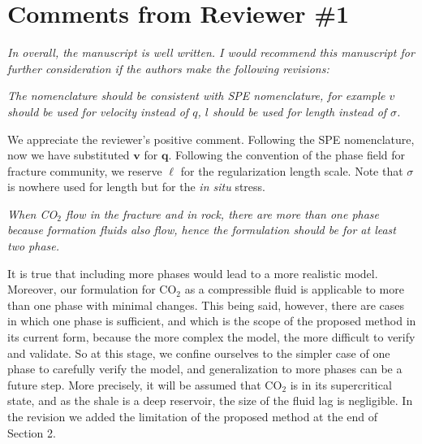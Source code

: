 \documentclass{elsarticle}
\newcommand{\review}[1]{ \textit{#1}}
\begin{document}

\section*{Comments from Reviewer \#1}

\review{In overall, the manuscript is well written. I would recommend this manuscript for further consideration if the authors make the following revisions:}

    \review{The nomenclature should be consistent with SPE nomenclature, for example $v$ should be used for velocity instead of $q$, $l$ should be used for length instead of $\sigma$.}

{We appreciate the reviewer's positive comment. Following the SPE nomenclature, now we have substituted $\mathbf{v}$ for $\mathbf{q}$. Following the convention of the phase field for fracture community, we reserve $\ell$ for the regularization length scale. Note that $\sigma$ is nowhere used for length but for the \textit{in situ} stress.}

\bigskip

    \review{When CO$_2$ flow in the fracture and in rock, there are more than one phase because formation fluids also flow, hence the formulation should be for at least two phase.}


{It is true that including more phases would lead to a more realistic model. Moreover, our formulation for CO$_2$ as a compressible fluid is applicable to more than one phase with minimal changes. This being said, however, there are cases in which one phase is sufficient, and which is the scope of the proposed method in its current form, because the more complex the model, the more difficult to verify and validate. So at this stage, we confine ourselves to the simpler case of one phase to carefully verify the model, and generalization to more phases can be a future step.
	More precisely, it will be assumed that CO$_2$ is in its supercritical state, and as the shale is a deep reservoir, the size of the fluid lag is negligible. In the revision we added the limitation of the proposed method at the end of Section 2.
}
\end{document}
